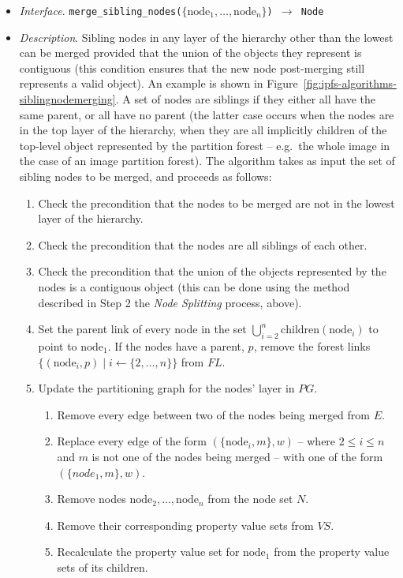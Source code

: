 \begin{itemize}

\item \emph{Interface}. \texttt{merge_sibling_nodes($\{\mbox{node}_1,\ldots,\mbox{node}_n\}$) $\rightarrow$ Node}

\item \emph{Description}. Sibling nodes in any layer of the hierarchy other than the lowest can be merged provided that the union of the objects they represent is contiguous (this condition ensures that the new node post-merging still represents a valid object). An example is shown in Figure~\ref{fig:ipfs-algorithms-siblingnodemerging}. A set of nodes are siblings if they either all have the same parent, or all have no parent (the latter case occurs when the nodes are in the top layer of the hierarchy, when they are all implicitly children of the top-level object represented by the partition forest -- e.g.~the whole image in the case of an image partition forest). The algorithm takes as input the set of sibling nodes to be merged, and proceeds as follows:

\begin{enumerate}

\item Check the precondition that the nodes to be merged are not in the lowest layer of the hierarchy.

\item Check the precondition that the nodes are all siblings of each other.

\item Check the precondition that the union of the objects represented by the nodes is a contiguous object (this can be done using the method described in Step 2 the \emph{Node Splitting} process, above).

\item Set the parent link of every node in the set $\bigcup_{i=2}^n \mbox{children}(\mbox{node}_i)$ to point to $\mbox{node}_1$. If the nodes have a parent, $p$, remove the forest links $\{(\mbox{node}_i, p) \; | \; i \leftarrow \{2,\ldots,n\}\}$ from $\textit{FL}$.

\item Update the partitioning graph for the nodes' layer in $\textit{PG}$.

\begin{enumerate}

\item Remove every edge between two of the nodes being merged from $E$.
\item Replace every edge of the form $(\{\mbox{node}_i, m\}, w)$ -- where $2 \le i \le n$ and $m$ is not one of the nodes being merged -- with one of the form $(\{node_1, m\}, w)$.
\item Remove nodes $\mbox{node}_2,\ldots,\mbox{node}_n$ from the node set $N$.
\item Remove their corresponding property value sets from $\textit{VS}$.
\item Recalculate the property value set for $\mbox{node}_1$ from the property value sets of its children.


\end{enumerate}
\end{enumerate}
\end{itemize}
